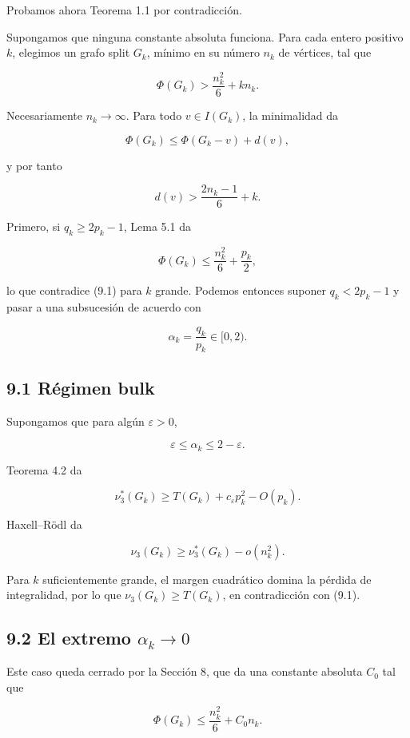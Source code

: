 \documentclass[spanish,11pt,a4paper]{article}
\begin{document}
Probamos ahora Teorema 1.1 por contradicción.

Supongamos que ninguna constante absoluta funciona. Para cada entero
positivo \(k\), elegimos un grafo split \(G_k\), mínimo en su número
\(n_k\) de vértices, tal que

\[
\Phi(G_k)
>
\frac{n_k^2}{6}+kn_k.
\tag{9.1}
\]

Necesariamente \(n_k\to\infty\). Para todo \(v\in I(G_k)\), la
minimalidad da

\[
\Phi(G_k)
\le
\Phi(G_k-v)+d(v),
\]

y por tanto

\[
\boxed{
d(v)>
\frac{2n_k-1}{6}+k
}.
\tag{9.2}
\]

Primero, si \(q_k\ge2p_k-1\), Lema 5.1 da

\[
\Phi(G_k)
\le
\frac{n_k^2}{6}+\frac{p_k}{2},
\]

lo que contradice (9.1) para \(k\) grande. Podemos entonces suponer
\(q_k<2p_k-1\) y pasar a una subsucesión de acuerdo con

\[
\alpha_k=\frac{q_k}{p_k}\in[0,2).
\]

\subsection{9.1 Régimen bulk}\label{ruxe9gimen-bulk}

Supongamos que para algún \(\varepsilon>0\),

\[
\varepsilon\le\alpha_k\le2-\varepsilon.
\]

Teorema 4.2 da

\[
\nu_3^*(G_k)
\ge
T(G_k)+c_\varepsilon p_k^2-O(p_k).
\]

Haxell--Rödl da

\[
\nu_3(G_k)
\ge
\nu_3^*(G_k)-o(n_k^2).
\]

Para \(k\) suficientemente grande, el margen cuadrático domina la
pérdida de integralidad, por lo que \(\nu_3(G_k)\ge T(G_k)\), en
contradicción con (9.1).

\subsection{\texorpdfstring{9.2 El extremo
\(\alpha_k\to0\)}{9.2 El extremo \textbackslash alpha\_k\textbackslash to0}}\label{el-extremo-alpha_kto0}

Este caso queda cerrado por la Sección 8, que da una constante absoluta
\(C_0\) tal que

\[
\Phi(G_k)
\le
\frac{n_k^2}{6}+C_0n_k.
\]
\end{document}
